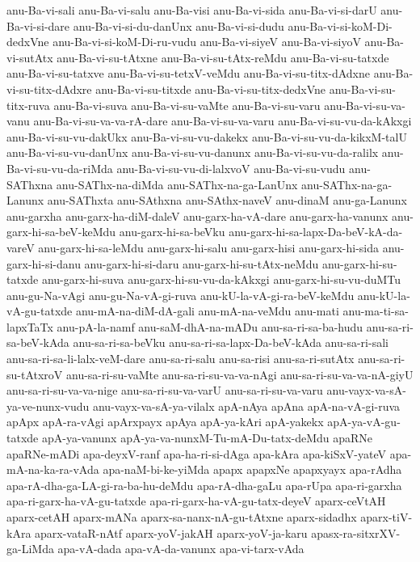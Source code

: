 {anu-Ba-vi-sali
anu-Ba-vi-salu
anu-Ba-visi
anu-Ba-vi-sida
anu-Ba-vi-si-darU
anu-Ba-vi-si-dare
anu-Ba-vi-si-du-danUnx
anu-Ba-vi-si-dudu
anu-Ba-vi-si-koM-Di-dedxVne
anu-Ba-vi-si-koM-Di-ru-vudu
anu-Ba-vi-siyeV
anu-Ba-vi-siyoV
anu-Ba-vi-sutAtx
anu-Ba-vi-su-tAtxne
anu-Ba-vi-su-tAtx-reMdu
anu-Ba-vi-su-tatxde
anu-Ba-vi-su-tatxve
anu-Ba-vi-su-tetxV-veMdu
anu-Ba-vi-su-titx-dAdxne
anu-Ba-vi-su-titx-dAdxre
anu-Ba-vi-su-titxde
anu-Ba-vi-su-titx-dedxVne
anu-Ba-vi-su-titx-ruva
anu-Ba-vi-suva
anu-Ba-vi-su-vaMte
anu-Ba-vi-su-varu
anu-Ba-vi-su-va-vanu
anu-Ba-vi-su-va-va-rA-dare
anu-Ba-vi-su-va-varu
anu-Ba-vi-su-vu-da-kAkxgi
anu-Ba-vi-su-vu-dakUkx
anu-Ba-vi-su-vu-dakekx
anu-Ba-vi-su-vu-da-kikxM-talU
anu-Ba-vi-su-vu-danUnx
anu-Ba-vi-su-vu-danunx
anu-Ba-vi-su-vu-da-ralilx
anu-Ba-vi-su-vu-da-riMda
anu-Ba-vi-su-vu-di-lalxvoV
anu-Ba-vi-su-vudu
anu-SAThxna
anu-SAThx-na-diMda
anu-SAThx-na-ga-LanUnx
anu-SAThx-na-ga-Lanunx
anu-SAThxta
anu-SAthxna
anu-SAthx-naveV
anu-dinaM
anu-ga-Lanunx
anu-garxha
anu-garx-ha-diM-daleV
anu-garx-ha-vA-dare
anu-garx-ha-vanunx
anu-garx-hi-sa-beV-keMdu
anu-garx-hi-sa-beVku
anu-garx-hi-sa-lapx-Da-beV-kA-da-vareV
anu-garx-hi-sa-leMdu
anu-garx-hi-salu
anu-garx-hisi
anu-garx-hi-sida
anu-garx-hi-si-danu
anu-garx-hi-si-daru
anu-garx-hi-su-tAtx-neMdu
anu-garx-hi-su-tatxde
anu-garx-hi-suva
anu-garx-hi-su-vu-da-kAkxgi
anu-garx-hi-su-vu-duMTu
anu-gu-Na-vAgi
anu-gu-Na-vA-gi-ruva
anu-kU-la-vA-gi-ra-beV-keMdu
anu-kU-la-vA-gu-tatxde
anu-mA-na-diM-dA-gali
anu-mA-na-veMdu
anu-mati
anu-ma-ti-sa-lapxTaTx
anu-pA-la-namf
anu-saM-dhA-na-mADu
anu-sa-ri-sa-ba-hudu
anu-sa-ri-sa-beV-kAda
anu-sa-ri-sa-beVku
anu-sa-ri-sa-lapx-Da-beV-kAda
anu-sa-ri-sali
anu-sa-ri-sa-li-lalx-veM-dare
anu-sa-ri-salu
anu-sa-risi
anu-sa-ri-sutAtx
anu-sa-ri-su-tAtxroV
anu-sa-ri-su-vaMte
anu-sa-ri-su-va-va-nAgi
anu-sa-ri-su-va-va-nA-giyU
anu-sa-ri-su-va-va-nige
anu-sa-ri-su-va-varU
anu-sa-ri-su-va-varu
anu-vayx-va-sA-ya-ve-nunx-vudu
anu-vayx-va-sA-ya-vilalx
apA-nAya
apAna
apA-na-vA-gi-ruva
apApx
apA-ra-vAgi
apArxpayx
apAya
apA-ya-kAri
apA-yakekx
apA-ya-vA-gu-tatxde
apA-ya-vanunx
apA-ya-va-nunxM-Tu-mA-Du-tatx-deMdu
apaRNe
apaRNe-mADi
apa-deyxV-ranf
apa-ha-ri-si-dAga
apa-kAra
apa-kiSxV-yateV
apa-mA-na-ka-ra-vAda
apa-naM-bi-ke-yiMda
apapx
apapxNe
apapxyayx
apa-rAdha
apa-rA-dha-ga-LA-gi-ra-ba-hu-deMdu
apa-rA-dha-gaLu
apa-rUpa
apa-ri-garxha
apa-ri-garx-ha-vA-gu-tatxde
apa-ri-garx-ha-vA-gu-tatx-deyeV
aparx-ceVtAH
aparx-cetAH
aparx-mANa
aparx-sa-nanx-nA-gu-tAtxne
aparx-sidadhx
aparx-tiV-kAra
aparx-vataR-nAtf
aparx-yoV-jakAH
aparx-yoV-ja-karu
apasx-ra-sitxrXV-ga-LiMda
apa-vA-dada
apa-vA-da-vanunx
apa-vi-tarx-vAda
}
